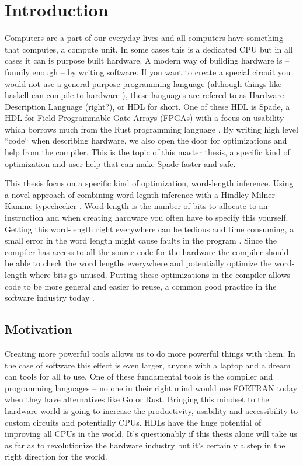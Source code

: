 \documentclass[msc,lith,english]{liuthesis}
\author{Edvard Thörnros}
\begin{document}
\chapter{Introduction}
\label{chaIntro}
Computers are a part of our everyday lives and all computers have something that computes, a compute unit. In some cases this is a dedicated CPU but in all cases it can is purpose built hardware. A modern way of building hardware is -- funnily enough -- by writing software. If you want to create a special circuit you would not use a general purpose programming language (although things like haskell can compile to hardware \cite{src:HaskellLib}), these languages are refered to as Hardware Description Language (right?), or HDL for short. One of these HDL is Spade, a HDL for Field Programmable Gate Arrays (FPGAs) with a focus on usability which borrows much from the Rust programming language \cite{src:spadeSomething}. By writing high level ``code`` when describing hardware, we also open the door for optimizations and help from the compiler. This is the topic of this master thesis, a specific kind of optimization and user-help that can make Spade faster and safe.

This thesis focus on a specific kind of optimization, word-length inference. Using a novel approach of combining word-legnth inference with a Hindley-Milner-Kamme typechecker \cite{src:SpadeTypes}. Word-length is the number of bits to allocate to an instruction and when creating hardware you often have to specify this yourself. Getting this word-length right everywhere can be tedious and time consuming, a small error in the word length might cause faults in the program \cite{src:BugsWithWordLength}. %
Since the compiler has access to all the source code for the hardware the compiler should be able to check the word lengths everywhere and potentially optimize the word-length where bits go unused. Putting these optimizations in the compiler allows code to be more general and easier to reuse, a common good practice in the software industry today \cite{src:generalCodeIsGood}.

\section{Motivation}
Creating more powerful tools allows us to do more powerful things with them. In the case of software this effect is even larger, anyone with a laptop and a dream can tools for all to use. One of these fundamental tools is the compiler and programming languages -- no one in their right mind would use FORTRAN today when they have alternatives like Go or Rust. Bringing this mindset to the hardware world is going to increase the productivity, usability and accessibility to custom circuits and potentially CPUs. HDLs have the huge potential of improving all CPUs in the world. It's questionably if this thesis alone will take us as far as to revolutionize the hardware industry but it's certainly a step in the right direction for the world.
\end{document}
